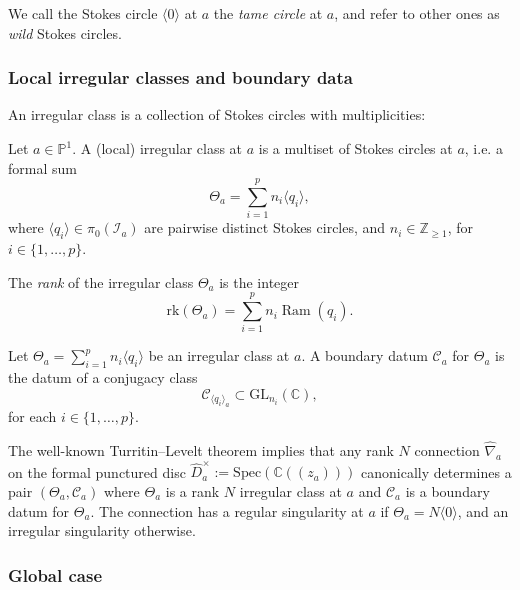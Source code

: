 \documentclass[11pt,a4paper]{amsart}
\numberwithin{equation}{section}
\DeclareMathOperator{\Ram}{Ram}
\newcommand{\cir}[1]{\langle #1 \rangle}
\begin{document}
We call the Stokes circle $\cir{0}$ at $a$ the \emph{tame circle} at $a$, and refer to other ones as \emph{wild} Stokes circles. 




\subsubsection{Local irregular classes and boundary data} An irregular class is a collection of Stokes circles with multiplicities:

\begin{definition}
Let $a\in \mathbb P^1$. A (local) irregular class at $a$ is a multiset of Stokes circles at $a$, i.e. a formal sum
\begin{equation}
\label{eq:irregular_class}
\Theta_a=\sum_{i=1}^{p} n_i \cir{q_i},
\end{equation}
where $\cir{q_i}\in \pi_0(\mathcal I_a)$ are pairwise distinct Stokes circles, and $n_i\in \mathbb Z_{\geq 1}$, for $i\in \{1, \dots, p\}$.

The \emph{rank} of the irregular class $\Theta_a$ is the integer
\begin{equation}
\mathrm{rk}(\Theta_a)=\sum_{i=1}^p n_i\Ram(q_i).
\end{equation}
\end{definition}

\begin{definition}
Let $\Theta_a=\sum_{i=1}^{p} n_i \cir{q_i}$ be an irregular class at $a$. A boundary datum $\mathcal C_a$ for $\Theta_a$ is the datum of a conjugacy class
\[
\mathcal C_{\cir{q_i}_a}\subset \mathrm{GL}_{n_i}(\mathbb C),
\]
for each $i\in \{1, \dots, p\}$.
\end{definition}

The well-known Turritin--Levelt theorem implies that any rank $N$ connection $\widehat \nabla_a$ on the formal punctured disc $\widehat D^{\times}_a:=\mathrm{Spec}(\mathbb C(\!(z_a)\!))$ canonically determines a pair $(\Theta_a, \mathcal C_a)$ where $\Theta_a$ is a rank $N$ irregular class at $a$ and $\mathcal C_a$  is a boundary datum for $\Theta_a$. The connection has a regular singularity at $a$ if $\Theta_a=N\cir{0}$, and an irregular singularity otherwise.




\subsubsection{Global case} 
\end{document}
